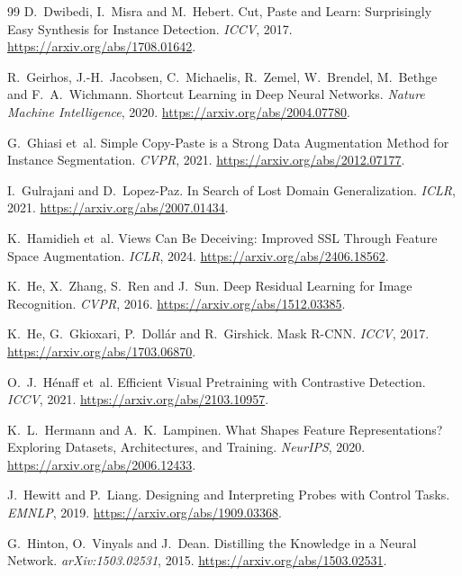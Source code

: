 \documentclass[11pt]{article}
\begin{document}
\begin{thebibliography}{99}
D.~Dwibedi, I.~Misra and M.~Hebert. Cut, Paste and Learn: Surprisingly Easy Synthesis for Instance Detection.
\emph{ICCV}, 2017. \url{https://arxiv.org/abs/1708.01642}.

R.~Geirhos, J.-H.~Jacobsen, C.~Michaelis, R.~Zemel, W.~Brendel, M.~Bethge and F.~A.~Wichmann. Shortcut Learning in Deep
Neural Networks. \emph{Nature Machine Intelligence}, 2020. \url{https://arxiv.org/abs/2004.07780}.

G.~Ghiasi et~al. Simple Copy-Paste is a Strong Data Augmentation Method for Instance Segmentation. \emph{CVPR}, 2021.
\url{https://arxiv.org/abs/2012.07177}.

I.~Gulrajani and D.~Lopez-Paz. In Search of Lost Domain Generalization. \emph{ICLR}, 2021.
\url{https://arxiv.org/abs/2007.01434}.

K.~Hamidieh et~al. Views Can Be Deceiving: Improved SSL Through Feature Space Augmentation. \emph{ICLR}, 2024.
\url{https://arxiv.org/abs/2406.18562}.

K.~He, X.~Zhang, S.~Ren and J.~Sun. Deep Residual Learning for Image Recognition. \emph{CVPR}, 2016.
\url{https://arxiv.org/abs/1512.03385}.

K.~He, G.~Gkioxari, P.~Doll\'ar and R.~Girshick. Mask R-CNN. \emph{ICCV}, 2017.
\url{https://arxiv.org/abs/1703.06870}.

O.~J.~H\'enaff et~al. Efficient Visual Pretraining with Contrastive Detection. \emph{ICCV}, 2021.
\url{https://arxiv.org/abs/2103.10957}.

K.~L.~Hermann and A.~K.~Lampinen. What Shapes Feature Representations? Exploring Datasets, Architectures, and Training.
\emph{NeurIPS}, 2020. \url{https://arxiv.org/abs/2006.12433}.

J.~Hewitt and P.~Liang. Designing and Interpreting Probes with Control Tasks. \emph{EMNLP}, 2019.
\url{https://arxiv.org/abs/1909.03368}.

G.~Hinton, O.~Vinyals and J.~Dean. Distilling the Knowledge in a Neural Network. \emph{arXiv:1503.02531}, 2015.
\url{https://arxiv.org/abs/1503.02531}.


\end{thebibliography}
\end{document}
